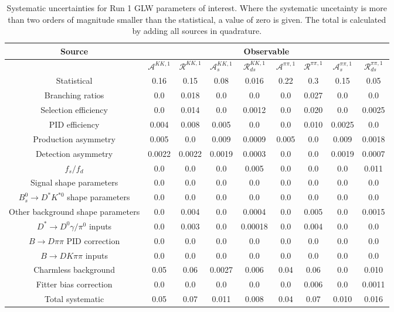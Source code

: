 \begin{sidewaystable}
  \centering
  \begin{tabular}{ccccccccc}
      \toprule
      Source & \multicolumn{8}{c}{Observable} \\
      \midrule
       & $\mathcal{A}^{KK,1}$ & $\mathcal{R}^{KK,1}$ & $\mathcal{A}_s^{KK,1}$ & $\mathcal{R}_{ds}^{KK,1}$ & $\mathcal{A}^{\pi\pi,1}$ & $\mathcal{R}^{\pi\pi,1}$ & $\mathcal{A}_s^{\pi\pi,1}$ & $\mathcal{R}_{ds}^{\pi\pi,1}$ \\
      \midrule
      Statistical & 0.16 & 0.15 & 0.08 & 0.016 & 0.22 & 0.3 & 0.15 & 0.05 \\
      \midrule
      Branching ratios & 0.0  & 0.018 & 0.0  & 0.0  & 0.0  & 0.027 & 0.0  & 0.0  \\
      Selection efficiency & 0.0  & 0.014 & 0.0  & 0.0012 & 0.0  & 0.020 & 0.0  & 0.0025 \\
      PID efficiency & 0.004 & 0.008 & 0.005 & 0.0  & 0.0  & 0.010 & 0.0025 & 0.0  \\
      Production asymmetry & 0.005 & 0.0  & 0.009 & 0.0009 & 0.005 & 0.0  & 0.009 & 0.0018 \\
      Detection asymmetry & 0.0022 & 0.0022 & 0.0019 & 0.0003 & 0.0  & 0.0  & 0.0019 & 0.0007 \\
      $f_s/f_d$ & 0.0  & 0.0  & 0.0  & 0.005 & 0.0  & 0.0  & 0.0  & 0.011 \\
      Signal shape parameters & 0.0  & 0.0  & 0.0  & 0.0  & 0.0  & 0.0  & 0.0  & 0.0  \\
      $B^0_s \to D^* K^{*0}$ shape parameters & 0.0  & 0.0  & 0.0  & 0.0  & 0.0  & 0.0  & 0.0  & 0.0  \\
      Other background shape parameters & 0.0  & 0.004 & 0.0  & 0.0004 & 0.0  & 0.005 & 0.0  & 0.0015 \\
      $D^* \to D^0 \gamma/\pi^0$ inputs & 0.0  & 0.003 & 0.0  & 0.00018 & 0.0  & 0.004 & 0.0  & 0.0  \\
      $B\to D\pi\pi$ PID correction & 0.0  & 0.0  & 0.0  & 0.0  & 0.0  & 0.0  & 0.0  & 0.0  \\
      $B\to DK\pi\pi$ inputs & 0.0  & 0.0  & 0.0  & 0.0  & 0.0  & 0.0  & 0.0  & 0.0  \\
      Charmless background & 0.05 & 0.06 & 0.0027 & 0.006 & 0.04 & 0.06 & 0.0  & 0.010 \\
      Fitter bias correction & 0.0  & 0.0  & 0.0  & 0.0  & 0.0  & 0.006 & 0.0  & 0.0011 \\
      \midrule
      Total systematic & 0.05 & 0.07 & 0.011 & 0.008 & 0.04 & 0.07 & 0.010 & 0.016 \\
      \bottomrule
  \end{tabular}
  \caption{Systematic uncertainties for Run 1 GLW parameters of interest. Where the systematic uncetainty is more than two orders of magnitude smaller than the statistical, a value of zero is given. The total is calculated by adding all sources in quadrature.}
\label{tab:KK_run1_systematics}
\end{sidewaystable}
